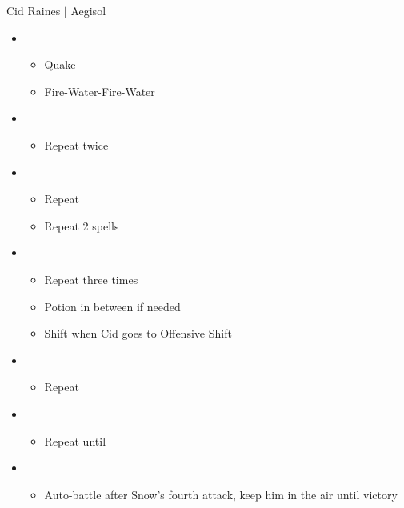 \begin{battle}{Cid Raines $|$ Aegisol}
\begin{multicols}{2}
\begin{itemize}
\begin{itemize}
    \end{itemize}
\end{itemize}
\columnbreak
\begin{itemize}
    \item \first
    \begin{itemize}
        \item Quake
        \item Fire-Water-Fire-Water
    \end{itemize}
    \item \third
    \begin{itemize}
        \item Repeat twice
    \end{itemize}
    \item \fifth
    \begin{itemize}
        \item Repeat
        \item Repeat 2 spells
    \end{itemize}
    \item \second
    \begin{itemize}
        \item Repeat three times
        \item Potion in between if needed
        \item Shift when Cid goes to Offensive Shift
    \end{itemize}
    \item \third
    \begin{itemize}
        \item Repeat
    \end{itemize}
    \item \second
    \begin{itemize}
        \item Repeat until \stagger
    \end{itemize}
    \item \sixth
    \begin{itemize}
        \item Auto-battle after Snow's fourth attack, keep him in the air until victory
    \end{itemize}
\end{itemize}
\end{multicols}
\end{battle}

